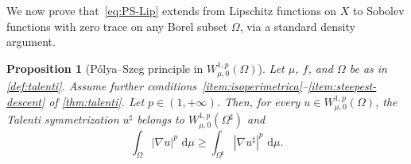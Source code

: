 \documentclass[a4paper,12pt,reqno]{amsart}
\numberwithin{equation}{section}
\renewcommand{\H}{\mathcal{H}}
\newcommand{\di}{\,\mathrm{d}}
\newcommand{\Om}{\Omega}
\theoremstyle{plain}
\newtheorem{proposition}[theorem]{Proposition}
\theoremstyle{definition}
\begin{document}
We now prove that~\eqref{eq:PS-Lip} extends from Lipschitz functions on $X$ to Sobolev functions with zero trace on any Borel subset $\Omega$, via a standard density argument.

\begin{proposition}[P\'olya--Szeg\H{o} principle in $W^{1,p}_{\mu,0}(\Omega)$]
\label{prop:polya-szego}
%
Let $\mu$, $f$, and $\Omega$ be as in \cref{def:talenti}. Assume further conditions~\ref{item:isoperimetrica}--\ref{item:steepest-descent} of \cref{thm:talenti}. Let $p\in(1,+\infty)$. Then, for every $u \in W^{1,p}_{\mu,0}(\Om)$, the Talenti symmetrization $u^\sharp$  belongs to $W^{1,p}_{\mu,0}(\Om^\sharp )$ and
\begin{equation}
\label{eq:extended-ps}
     \int_\Om |\nabla u|^p \, \di \mu 
    \geq \int_{\Om^\sharp} |\nabla u^\sharp|^p \, \di \mu.
\end{equation}
%
\end{proposition}
\end{document}
